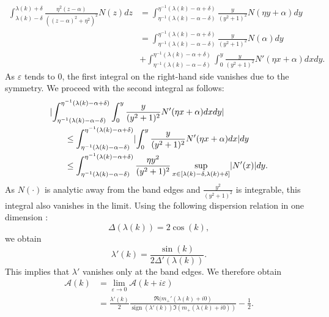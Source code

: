\documentclass[a4paper,reqno,twoside]{amsart}
\numberwithin{equation}{section}
\theoremstyle{definition}
\newcommand{\<}{\ensuremath \leq}
\renewcommand{\>}{\ensuremath \geq}
\newcommand{\nm}{\noalign{\smallskip}}
\newcommand{\ds}{\displaystyle}
\renewcommand{\epsilon}{\varepsilon}
\begin{document}
\begin{equation}
    \begin{aligned}
        \int_{\lambda(k)-\delta}^{\lambda(k)+\delta}\frac{\eta^2(z-\alpha)}{((z-\alpha)^2+\eta^2)^2}N(z)dz&=\int_{\eta^{-1}(\lambda(k)-\alpha-\delta)}^{\eta^{-1}(\lambda(k)-\alpha+\delta)}\frac{y}{(y^2+1)^2}N(\eta y + \alpha)dy\\
        &=\int_{\eta^{-1}(\lambda(k)-\alpha-\delta)}^{\eta^{-1}(\lambda(k)-\alpha+\delta)}\frac{y}{(y^2+1)^2}N( \alpha)dy\\
        &+\int_{\eta^{-1}(\lambda(k)-\alpha-\delta)}^{\eta^{-1}(\lambda(k)-\alpha+\delta)}\int_0^y\frac{y}{(y^2+1)^2}N'(\eta x +  \alpha)dxdy.
    \end{aligned}
\end{equation}
As $\epsilon$ tends to 0, the first integral on the right-hand side vanishes due to the symmetry. We proceed with the second integral as follows:
\begin{equation}
    \begin{array}{l}
        \ds \lvert\int_{\eta^{-1}(\lambda(k)-\alpha-\delta)}^{\eta^{-1}(\lambda(k)-\alpha+\delta)}\int_0^y\frac{y}{(y^2+1)^2}N'(\eta x +  \alpha)dxdy\rvert\\
        \nm
        \qquad \ds \leq\int_{\eta^{-1}(\lambda(k)-\alpha-\delta)}^{\eta^{-1}(\lambda(k)-\alpha+\delta)}\lvert\int_0^y\frac{y}{(y^2+1)^2}N'(\eta x +  \alpha) dx\rvert dy\\
        \nm
        \qquad \ds \leq\int_{\eta^{-1}(\lambda(k)-\alpha-\delta)}^{\eta^{-1}(\lambda(k)-\alpha+\delta)}\frac{\eta y^2}{(y^2+1)^2}\sup_{x\in[\lambda(k)-\delta,\lambda(k)+\delta]}\lvert N'(x)\rvert dy.
    \end{array}
\end{equation}
As $N(\cdot)$ is analytic away from the band edges and $\frac{y^2}{(y^2+1)^2}$ is integrable, this integral also vanishes in the limit. Using the following dispersion relation in one dimension \cite{kuchment2016overview}:
\begin{equation}
    \Delta(\lambda(k)) = 2\cos(k),
\end{equation}
we obtain
\begin{equation}
    \lambda'(k) = \frac{\sin(k)}{2\Delta'(\lambda(k))}.
\end{equation}
This implies that $\lambda'$ vanishes only at the band edges. We therefore obtain
\begin{equation}
    \begin{aligned}
        \mathcal{A}(k) &= \lim_{\epsilon\rightarrow0}\mathcal{A}(k+i\epsilon)\\
        &=\frac{\lambda'(k)}{2}\frac{\Re (m_+'(\lambda(k) + i0)}{\operatorname{sign}(\lambda'(k))\Im (m_+(\lambda(k) + i0))}-\frac{1}{2}.
    \end{aligned}
\end{equation}
\end{document}
